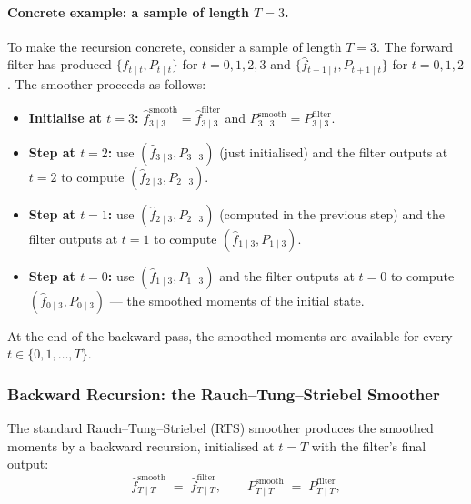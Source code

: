 \documentclass[11pt, a4paper, oneside]{article}
\begin{document}
\paragraph{Concrete example: a sample of length $T = 3$.}
To make the recursion concrete, consider a sample of length $T = 3$.
The forward filter has produced
$\{\hat{f}_{t \mid t}, P_{t \mid t}\}$ for $t = 0, 1, 2, 3$ and
$\{\hat{f}_{t+1 \mid t}, P_{t+1 \mid t}\}$ for $t = 0, 1, 2$. The
smoother proceeds as follows:
\begin{itemize}[leftmargin=1.5em, itemsep=2pt]
    \item \textbf{Initialise at $t = 3$:}
          $\hat{f}_{3 \mid 3}^{\mathrm{smooth}} = \hat{f}_{3 \mid 3}^{\mathrm{filter}}$
          and $P_{3 \mid 3}^{\mathrm{smooth}} = P_{3 \mid 3}^{\mathrm{filter}}$.
    \item \textbf{Step at $t = 2$:} use $(\hat{f}_{3 \mid 3}, P_{3 \mid 3})$
          (just initialised) and the filter outputs at $t = 2$ to
          compute $(\hat{f}_{2 \mid 3}, P_{2 \mid 3})$.
    \item \textbf{Step at $t = 1$:} use $(\hat{f}_{2 \mid 3}, P_{2 \mid 3})$
          (computed in the previous step) and the filter outputs at
          $t = 1$ to compute $(\hat{f}_{1 \mid 3}, P_{1 \mid 3})$.
    \item \textbf{Step at $t = 0$:} use $(\hat{f}_{1 \mid 3}, P_{1 \mid 3})$
          and the filter outputs at $t = 0$ to compute
          $(\hat{f}_{0 \mid 3}, P_{0 \mid 3})$ — the smoothed moments
          of the initial state.
\end{itemize}
At the end of the backward pass, the smoothed moments are available
for every $t \in \{0, 1, \ldots, T\}$.


\subsubsection{Backward Recursion: the Rauch–Tung–Striebel Smoother}

The standard Rauch–Tung–Striebel (RTS) smoother produces the smoothed
moments by a backward recursion, initialised at $t = T$ with the
filter's final output:
\[
\hat{f}_{T \mid T}^{\mathrm{smooth}} \;=\; \hat{f}_{T \mid T}^{\mathrm{filter}},
\qquad
P_{T \mid T}^{\mathrm{smooth}} \;=\; P_{T \mid T}^{\mathrm{filter}},
\]
\end{document}
